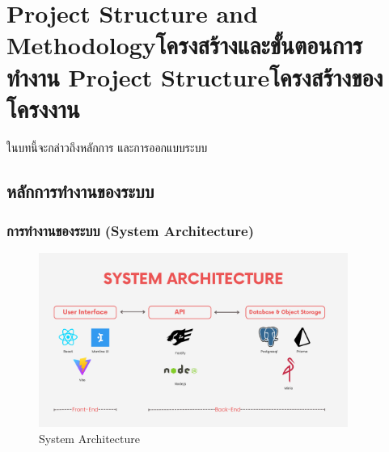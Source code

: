 \chapter{\ifproject%
      \ifenglish Project Structure and Methodology\else โครงสร้างและขั้นตอนการทำงาน\fi
  \else%
      \ifenglish Project Structure\else โครงสร้างของโครงงาน\fi
  \fi
 }

ในบทนี้จะกล่าวถึงหลักการ และการออกแบบระบบ

\makeatletter


\makeatother

\section{หลักการทำงานของระบบ}


\subsection{การทำงานของระบบ (System Architecture)}
\begin{figure}[h]
    \begin{center}
        \includegraphics[width=0.9\textwidth]{img/system achitecture.png}
    \end{center}
    \caption{System Architecture}
    \label{fig:system_overview}
\end{figure}

